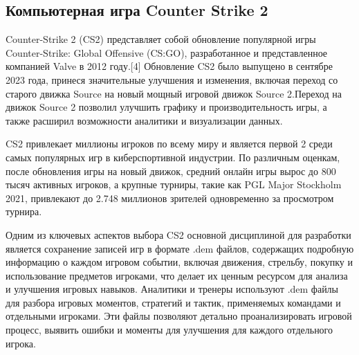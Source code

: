 \subsection{Компьютерная игра Counter Strike 2}

Counter-Strike 2 (CS2) представляет собой обновление популярной игры Counter-Strike: Global Offensive (CS:GO), разработанное и представленное компанией Valve в 2012 году.[4] Обновление CS2 было выпущено в сентябре 2023 года, принеся значительные улучшения и изменения, включая переход со старого движка Source на новый мощный игровой движок Source 2.Переход на движок Source 2 позволил улучшить графику и производительность игры, а также расширил возможности аналитики и визуализации данных.

CS2 привлекает миллионы игроков по всему миру и является первой  2 среди самых популярных игр в киберспортивной индустрии. По различным оценкам, после обновления игры на новый движок, средний онлайн игры вырос до 800 тысяч активных игроков, а крупные турниры, такие как PGL Major Stockholm 2021, привлекают до 2.748 миллионов зрителей одновременно за просмотром турнира.

Одним из ключевых аспектов выбора CS2 основной дисциплиной для разработки является сохранение записей игр в формате .dem файлов, содержащих подробную информацию о каждом игровом событии, включая движения, стрельбу, покупку и использование предметов игроками, что делает их ценным ресурсом для анализа и улучшения игровых навыков. Аналитики и тренеры используют .dem файлы для разбора игровых моментов, стратегий и тактик, применяемых командами и отдельными игроками. Эти файлы позволяют детально проанализировать игровой процесс, выявить ошибки и моменты для улучшения для каждого отдельного игрока.

